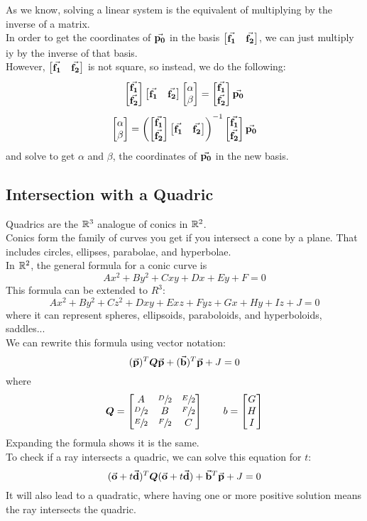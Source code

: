 \documentclass[12pt]{article}
\begin{document}
As we know, solving a linear system
is the equivalent of multiplying by the inverse
of a matrix. \\
In order to get the coordinates of $\vec{\mathbf{p_0}}$
in the basis $\begin{bmatrix} \vec{\mathbf{f_1}} & \vec{\mathbf{f_2}} \end{bmatrix}$,
we can just multiply iy by the inverse
of that basis. \\
However, $\begin{bmatrix} \vec{\mathbf{f_1}} & \vec{\mathbf{f_2}} \end{bmatrix}$
is not square, so instead, we do the following:
\[ \begin{bmatrix} \vec{\mathbf{f_1}} \\ \vec{\mathbf{f_2}} \end{bmatrix}
 \begin{bmatrix} \vec{\mathbf{f_1}} & \vec{\mathbf{f_2}} \end{bmatrix}
\begin{bmatrix} \alpha \\ \beta \end{bmatrix}
= \begin{bmatrix} \vec{\mathbf{f_1}} \\ \vec{\mathbf{f_2}} \end{bmatrix}\vec{\mathbf{p_0}} \]
\[ \begin{bmatrix} \alpha \\ \beta \end{bmatrix}
= \left( \begin{bmatrix} \vec{\mathbf{f_1}} \\ \vec{\mathbf{f_2}} \end{bmatrix}
\begin{bmatrix} \vec{\mathbf{f_1}} & \vec{\mathbf{f_2}} \end{bmatrix} \right)^{-1}
\begin{bmatrix} \vec{\mathbf{f_1}} \\ \vec{\mathbf{f_2}} \end{bmatrix}\vec{\mathbf{p_0}} \]
and solve to get $\alpha$ and $\beta$,
the coordinates of $\vec{\mathbf{p_0}}$
in the new basis. \\

\newpage

\subsection*{Intersection with a Quadric}

Quadrics are the $\mathbb{R}^3$ analogue of conics in $\mathbb{R}^2$. \\
Conics form the family of curves you get if you intersect
a cone by a plane.
That includes circles, ellipses, parabolae,
and hyperbolae. \\
In $\mathbb{R}^2$, the general formula for a conic curve is
\[ Ax^2 + By^2 + Cxy + Dx + Ey + F = 0 \]
This formula can be extended to $R^3$:
\[ Ax^2 + By^2 + Cz^2 + Dxy + Exz + Fyz +
Gx + Hy + Iz + J = 0 \]
where it can represent spheres, ellipsoids,
paraboloids, and hyperboloids, saddles... \\

We can rewrite this formula using vector notation:
\[ (\vec{\mathbf{p}})^T \boldsymbol{Q}\vec{\mathbf{p}} 
+ (\vec{\mathbf{b}})^T\vec{\mathbf{p}} + J = 0 \]
where
\[ 
    \boldsymbol{Q} = 
    \begin{bmatrix} A & \sfrac{D}{2} & \sfrac{E}{2} \\ \sfrac{D}{2} & B & \sfrac{F}
    {2} \\ \sfrac{E}{2} & \sfrac{F}{2} & C \end{bmatrix}
    \qquad b = \begin{bmatrix} G \\ H \\ I \end{bmatrix}
\]
Expanding the formula shows it is the same. \\

To check if a ray intersects a quadric,
we can solve this equation for $t$:
\[ (\vec{\mathbf{o}} + t\vec{\mathbf{d}})^T \boldsymbol{Q} (\vec{\mathbf{o}} + t\vec{\mathbf{d}})
    + \vec{\mathbf{b}}^T\vec{\mathbf{p}} + J = 0 \]
It will also lead to a quadratic, 
where having one or more positive solution
means the ray intersects the quadric. \\
\end{document}
